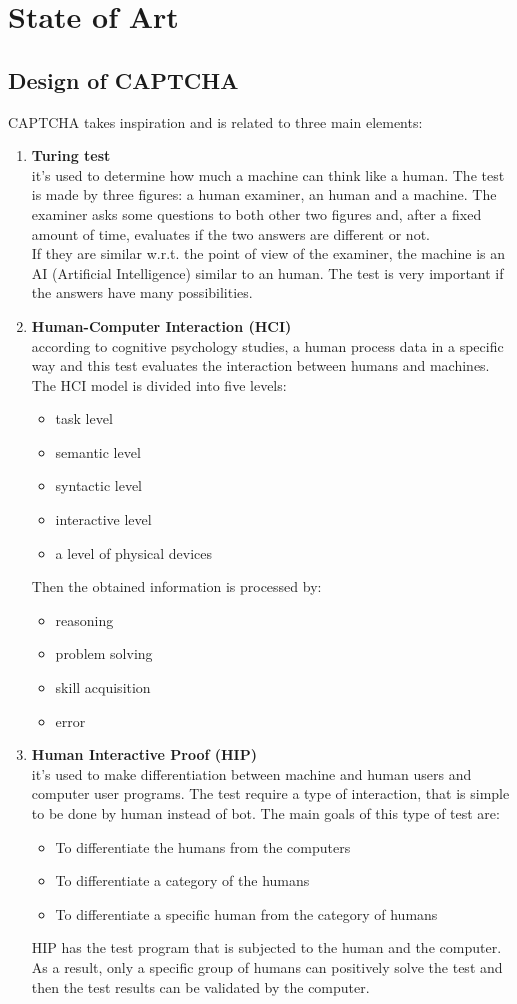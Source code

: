 \chapter{State of Art}\label{chapter:StateOfArt}
\section{Design of CAPTCHA}
CAPTCHA takes inspiration and is related to three main elements\cite{types_CAPTCHA}:
\begin{enumerate}
\item{\textbf{Turing test}\\
it's used to determine how much a machine can think like a human. The test is made by three figures: a human examiner, an human and a machine. The examiner asks some questions to both other two figures and, after a fixed amount of time, evaluates if the two answers are different or not.\\
If they are similar w.r.t. the point of view of the examiner, the machine is an AI (Artificial Intelligence) similar to an human. The test is very important if the answers have many possibilities. 
}
\item{\textbf{Human-Computer Interaction (HCI)}\\
according to cognitive psychology studies, a human process data in a specific way and this test evaluates the interaction between humans and machines. The HCI model is divided into five levels:
\begin{itemize}
\item{task level}
\item{semantic level}
\item{syntactic level}
\item{interactive level}
\item{a level of physical devices}
\end{itemize}   
Then the obtained information is processed by:
\begin{itemize}
\item{reasoning}
\item{problem solving}
\item{skill acquisition}
\item{error}
\end{itemize}   
}
\item{\textbf{Human Interactive Proof (HIP)}\\
it's used to make differentiation between machine and human users and computer user programs. The test require a type of interaction, that is simple to be done by human instead of bot. The main goals of this type of test are:
\begin{itemize}
\item{To differentiate the humans from the computers}
\item{To differentiate a category of the humans}
\item{To differentiate a specific human from the category of humans}
\end{itemize}
HIP has the test program that is subjected to the human and the computer. As a result, only a specific group of humans can positively solve the test and then the test results can be validated by the computer.
}
\end{enumerate}
